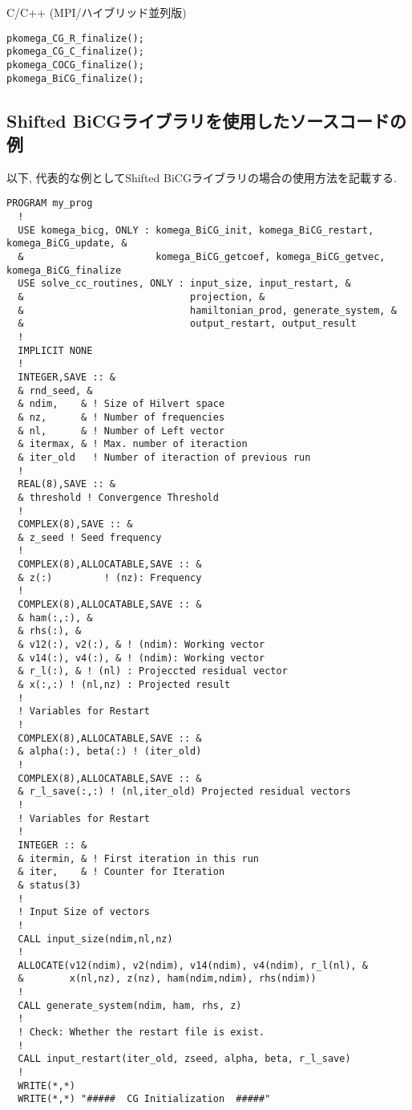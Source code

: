 \documentclass[12pt,titlepage]{jarticle}
\begin{document}
\noindent C/C++ (MPI/ハイブリッド並列版)
\begin{verbatim}
pkomega_CG_R_finalize();
pkomega_CG_C_finalize();
pkomega_COCG_finalize();
pkomega_BiCG_finalize();
\end{verbatim}

\subsection{Shifted BiCGライブラリを使用したソースコードの例}

以下, 代表的な例としてShifted BiCGライブラリの場合の使用方法を記載する. 

\begin{lstlisting}
PROGRAM my_prog
  !
  USE komega_bicg, ONLY : komega_BiCG_init, komega_BiCG_restart, komega_BiCG_update, &
  &                       komega_BiCG_getcoef, komega_BiCG_getvec, komega_BiCG_finalize
  USE solve_cc_routines, ONLY : input_size, input_restart, &
  &                             projection, &
  &                             hamiltonian_prod, generate_system, &
  &                             output_restart, output_result
  !
  IMPLICIT NONE
  !
  INTEGER,SAVE :: &
  & rnd_seed, &
  & ndim,    & ! Size of Hilvert space
  & nz,      & ! Number of frequencies
  & nl,      & ! Number of Left vector
  & itermax, & ! Max. number of iteraction
  & iter_old   ! Number of iteraction of previous run
  !
  REAL(8),SAVE :: &
  & threshold ! Convergence Threshold
  !
  COMPLEX(8),SAVE :: &
  & z_seed ! Seed frequency
  !
  COMPLEX(8),ALLOCATABLE,SAVE :: &
  & z(:)         ! (nz): Frequency
  !
  COMPLEX(8),ALLOCATABLE,SAVE :: &
  & ham(:,:), &
  & rhs(:), &
  & v12(:), v2(:), & ! (ndim): Working vector
  & v14(:), v4(:), & ! (ndim): Working vector
  & r_l(:), & ! (nl) : Projeccted residual vector 
  & x(:,:) ! (nl,nz) : Projected result 
  !
  ! Variables for Restart
  !
  COMPLEX(8),ALLOCATABLE,SAVE :: &
  & alpha(:), beta(:) ! (iter_old) 
  !
  COMPLEX(8),ALLOCATABLE,SAVE :: &
  & r_l_save(:,:) ! (nl,iter_old) Projected residual vectors
  !
  ! Variables for Restart
  !
  INTEGER :: &
  & itermin, & ! First iteration in this run
  & iter,    & ! Counter for Iteration
  & status(3)
  !
  ! Input Size of vectors
  !
  CALL input_size(ndim,nl,nz)
  !
  ALLOCATE(v12(ndim), v2(ndim), v14(ndim), v4(ndim), r_l(nl), &
  &        x(nl,nz), z(nz), ham(ndim,ndim), rhs(ndim))
  !
  CALL generate_system(ndim, ham, rhs, z)
  !
  ! Check: Whether the restart file is exist.
  !
  CALL input_restart(iter_old, zseed, alpha, beta, r_l_save)
  !
  WRITE(*,*)
  WRITE(*,*) "#####  CG Initialization  #####"

\end{lstlisting}
\end{document}
